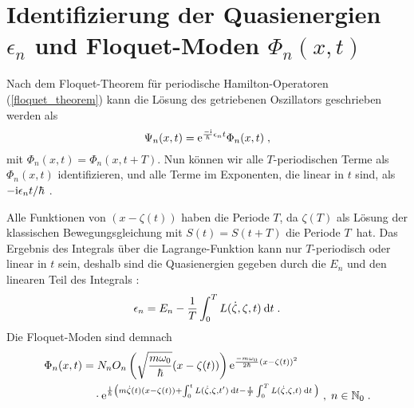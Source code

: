       \section{\texorpdfstring{Identifizierung der Quasienergien $\epsilon_n$ und Floquet-Moden $\Phi_n(x,t)$}{Identifizierung der Quasienergien epsilon_n und Floquet-Moden Phi_n(x,t)}}
        Nach dem Floquet-Theorem für periodische Hamilton-Operatoren (\ref{floquet_theorem}) kann die Lösung des getriebenen Oszillators geschrieben werden als
        \begin{equation}
          \Psi_n(x,t) = \text e^{\frac{-\text i}{\hbar}\epsilon_nt}\Phi_n(x,t) \; ,
        \end{equation}
        mit $\Phi_n(x,t)=\Phi_n(x,t+T)$.
        Nun können wir alle $T$-periodischen Terme als $\Phi_n(x,t)$ identifizieren, und alle Terme im Exponenten, die linear in $t$ sind, als $-\text i\epsilon_n t/\hbar$ \cite{haengi}.

        Alle Funktionen von $(x-\zeta(t))$ haben die Periode $T$, da $\zeta(T)$ als Lösung der klassischen Bewegungsgleichung mit $S(t)=S(t+T)$ die Periode $T$ \,hat. Das
        Ergebnis des Integrals über die Lagrange-Funktion kann nur $T$-periodisch oder linear in $t$ sein, deshalb sind die Quasienergien gegeben durch die $E_n$ und den linearen Teil des Integrals \cite{haengi}:
        \begin{equation}
          \epsilon_n = E_n - \frac{1}{T} \int_0^T L(\dot \zeta, \zeta, t) \: \text d t \; .
          \label{epsilon_einzelner}
        \end{equation}
        Die Floquet-Moden sind demnach
        \begin{align}
          \begin{split}
            \Phi_n(x,t) &=
             N_nO_n\left(\sqrt{\frac{m\omega_0}{\hbar}}(x-\zeta(t))\right) \text e^{\frac{-m\omega_0}{2\hbar}(x-\zeta(t))^2} \\
            &\quad \cdot \text e^{\frac{\text i}{\hbar}\left(m\dot \zeta(t)(x-\zeta(t))+\int_0^tL(\dot \zeta,\zeta,t')\:\text d t-\frac{t}{T} \int_0^T L(\dot \zeta,\zeta,t)\:\text dt\: \right)} \; ,
            \;n \in \mathbb{N}_0 \; .
            \label{floquet_moden_einzelner}
          \end{split}
        \end{align}


